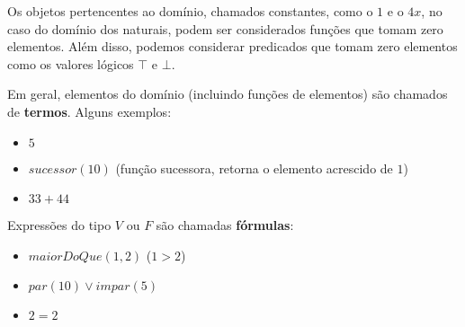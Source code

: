         Os objetos pertencentes ao domínio, chamados constantes, como o $1$ e o $4x$, no caso do domínio dos naturais, podem ser considerados funções que tomam zero elementos. Além disso, podemos considerar predicados que tomam zero elementos como os valores lógicos $\top$ e $\bot$.

        Em geral, elementos do domínio (incluindo funções de elementos) são chamados de \textbf{termos}. Alguns exemplos:

        \begin{itemize}
            \item $5$
            \item $sucessor(10)$ (função sucessora, retorna o elemento acrescido de $1$)
            \item $33+44$
        \end{itemize}

        Expressões do tipo $V$ ou $F$ são chamadas \textbf{fórmulas}:

        \begin{itemize}
            \item $maiorDoQue(1,2)$ ($1 > 2$)
            \item $par(10) \lor impar(5)$
            \item $2=2$
        \end{itemize}

        